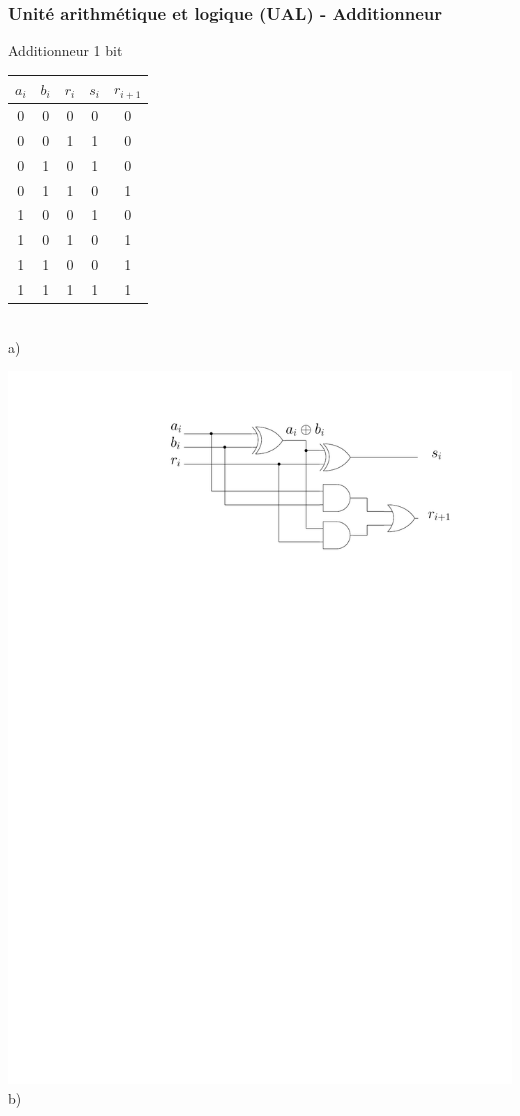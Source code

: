 \documentclass{beamer}
\begin{document}
\begin{frame}
\frametitle{Unité arithmétique et logique (UAL) - Additionneur}
\begin{block}{Additionneur 1 bit}
  \begin{minipage}[c]{.46\linewidth}
\begin{tabular}{ccc|cc}
$a_i$ & $b_i$ & $r_i$ & $s_i$ & $r_{i+1}$\\
\hline
0 & 0 & 0& 0 & 0\\
0 & 0 & 1& 1 & 0\\
0 & 1 & 0 & 1 & 0\\
0 & 1 & 1 & 0 & 1\\
1 & 0 & 0 & 1 & 0\\
1 & 0 & 1 & 0 & 1\\
1 & 1 & 0 & 0 & 1\\
1 & 1 & 1 & 1 & 1
\end{tabular}\\\centering a)
   \end{minipage} \hfill
   \begin{minipage}[c]{.46\linewidth}
\includegraphics[width=\columnwidth]{Figs/adder.pdf}\\\centering b)
   \end{minipage}

\end{block}
\end{frame}
\end{document}
